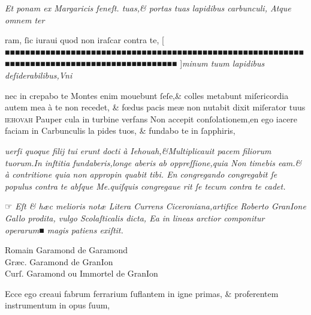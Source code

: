 \documentclass{article}
\newcommand{\threecolumntypefacenames}[3]{\begin{multicols}{3}
		\tiny
		\hfill \qquad \qquad \qquad \qquad #1\hspace*{\fill}\\
		\columnbreak
		\hfill #2\hspace*{\fill}\\
		\columnbreak
		\hfill #3\qquad \qquad \qquad \qquad \hspace*{\fill}
\end{multicols}}
\begin{document}
{\begin{multicols}{2}
	\columnbreak
	\justifying
	\noindent
	\textit{Et ponam ex Margaricis feneſt. tuas,\& portas tuas lapidibus carbunculi, Atque omnem ter\linebreak}
\end{multicols}
\fontsize{7}{8}\selectfont
\vspace{-2.5\baselineskip}
\noindent ram, ſic iuraui quod non iraſcar contra te, \hfill[  ■■■■■■■■■■■■■■■■■■■■■■■■■■■■■■■■■■■■■■■■■■■■■■■■■■■■■■■■■■■■■■■■■■■■■■■■■■■■■■■■■■■■■■■■■■■■■ ]\hfill \textit{minum tuum lapidibus deſiderabilibus,Vni}
\vspace{-1.4\baselineskip}
\begin{multicols}{2}
	\fontsize{7}{8}\selectfont
	\justifying
	\noindent nec in crepabo te Montes enim mouebunt ſeſe,\& colles metabunt miſericordia autem mea\linebreak
	\`a te non recedet, \& f\oe{}dus pacis me\ae{} non nutabit dixit miſerator tuus \textsc{ iehovah} Pauper\linebreak
	cula in turbine verfans Non accepit conſolationem,en ego iacere faciam in Carbunculis la\linebreak
	pides tuos, \& fundabo te in ſapphiris,

	\columnbreak
	\justifying
	\noindent
	\textit{uerſi quoque filij tui erunt docti \`a Iehouah,\&Multiplicauit pacem filiorum tuorum.In inftitia\linebreak
		fundaberis,longe aberis ab oppreſſione,quia Non timebis eam.\& \`a contritione quia non appropin\linebreak
		quabit tibi. En congregando congregabit ſe populus contra te abſque Me.quiſquis congregaue\linebreak
		rit ſe tecum contra te cadet.}
\end{multicols}
\vspace{-1\baselineskip}
\noindent{}  \normalsize ☞ \fontsize{6}{7}\selectfont\textit{Eſt \& h\ae{}c melioris not\ae{} Litera Currens Ciceroniana,artifice Roberto GranIone Gallo prodita, vulgo Scolaſticalis dicta, Ea in lineas arctior componitur operarum■ magis patiens exiſtit.}
\threecolumntypefacenames{Romain Garamond de Garamond}{Gr\ae{}c. Garamond de GranIon}{Curſ. Garamond ou Immortel de GranIon}
\vspace{-3\baselineskip}
\begin{multicols}{2}
	\fontsize{6.25}{7}\selectfont
	\justifying
	\noindent \quad Ecce ego creaui fabrum ferrarium ſuflantem in igne primas, \& proferentem instrumentum in opus ſuum,\\


\end{multicols}}
\end{document}
